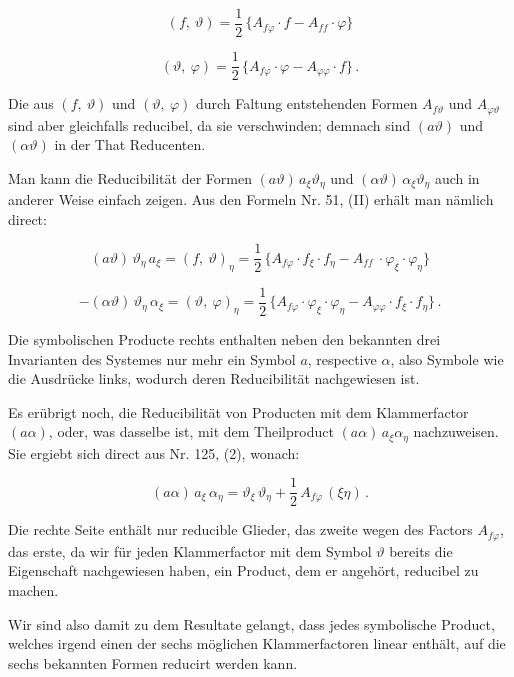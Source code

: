 \documentclass[11pt]{article}
\providecommand{\gesperrt}[1]{\textls[130]{#1}}
\providecommand{\weberpage}[1]{}
\begin{document}
\[
(f,\ \vartheta) = \frac{1}{2}\,\{A_{f\varphi}\cdot f - A_{ff}\cdot\varphi\}
\]

\[
(\vartheta,\ \varphi) = \frac{1}{2}\,\{A_{f\varphi}\cdot\varphi - A_{\varphi\varphi}\cdot f\}\,.
\]

Die aus $(f,\ \vartheta)$ und $(\vartheta,\ \varphi)$ durch Faltung entstehenden Formen
$A_{f\vartheta}$ und $A_{\varphi\vartheta}$ sind aber gleichfalls reducibel, da sie verschwinden;
demnach sind $(a\vartheta)$ und $(\alpha\vartheta)$ in der That Reducenten.

Man kann die Reducibilität der Formen $(a\vartheta)\,a_\xi\vartheta_\eta$ und $(\alpha\vartheta)\,\alpha_\xi\vartheta_\eta$
auch in anderer Weise einfach zeigen. Aus den Formeln Nr. 51, (II)
erhält man nämlich direct:

\[
(a\vartheta)\,\vartheta_\eta\,a_\xi = (f,\ \vartheta)_\eta = \frac{1}{2}\,\{A_{f\varphi}\cdot f_\xi\cdot f_\eta - A_{ff}\ \cdot\varphi_\xi\cdot\varphi_\eta\}
\]

\[
-(\alpha\vartheta)\,\vartheta_\eta\,\alpha_\xi = (\vartheta,\ \varphi)_\eta = \frac{1}{2}\,\{A_{f\varphi}\cdot\varphi_\xi\cdot\varphi_\eta - A_{\varphi\varphi}\cdot f_\xi\cdot f_\eta\}\,.
\]

Die symbolischen Producte rechts enthalten neben den bekannten
drei Invarianten des Systemes nur mehr ein Symbol $a$, respective
$\alpha$, also \gesperrt{weniger} Symbole wie die Ausdrücke links, wodurch deren
Reducibilität nachgewiesen ist.

Es erübrigt noch, die Reducibilität von Producten mit dem Klammerfactor $(a\alpha)$, oder, was dasselbe ist, mit dem Theilproduct $(a\alpha)\,a_\xi\alpha_\eta$
nachzuweisen. Sie ergiebt sich direct aus Nr. 125, (2), wonach:

\[
(a\alpha)\,a_\xi\,\alpha_\eta = \vartheta_\xi\,\vartheta_\eta + \frac{1}{2}\,A_{f\varphi}\,(\xi\eta)\,.
\]


\weberpage{143}

Die rechte Seite enthält nur reducible Glieder, das zweite wegen
des Factors $A_{f\varphi}$, das erste, da wir für jeden Klammerfactor mit dem
Symbol $\vartheta$ bereits die Eigenschaft nachgewiesen haben, ein Product,
dem er angehört, reducibel zu machen.

Wir sind also damit zu dem Resultate gelangt, dass jedes symbolische Product, welches irgend einen der sechs möglichen Klammerfactoren linear enthält, auf die sechs bekannten Formen reducirt
werden kann.
\end{document}
